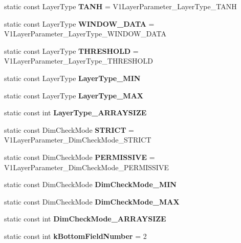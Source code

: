 \begin{DoxyCompactItemize}
\mbox{\label{classcaffe_1_1_v1_layer_parameter_aeb66f78f2e1d0ab91ce7bd97054804fd}} 
static const Layer\+Type {\bfseries T\+A\+NH} = V1\+Layer\+Parameter\+\_\+\+Layer\+Type\+\_\+\+T\+A\+NH
\item 
\mbox{\label{classcaffe_1_1_v1_layer_parameter_a9fcdf6f8449f6aea413b1c9673f23f85}} 
static const Layer\+Type {\bfseries W\+I\+N\+D\+O\+W\+\_\+\+D\+A\+TA} = V1\+Layer\+Parameter\+\_\+\+Layer\+Type\+\_\+\+W\+I\+N\+D\+O\+W\+\_\+\+D\+A\+TA
\item 
\mbox{\label{classcaffe_1_1_v1_layer_parameter_aba58530370567f9f58601f9f447c6b21}} 
static const Layer\+Type {\bfseries T\+H\+R\+E\+S\+H\+O\+LD} = V1\+Layer\+Parameter\+\_\+\+Layer\+Type\+\_\+\+T\+H\+R\+E\+S\+H\+O\+LD
\item 
static const Layer\+Type {\bfseries Layer\+Type\+\_\+\+M\+IN}
\item 
static const Layer\+Type {\bfseries Layer\+Type\+\_\+\+M\+AX}
\item 
static const int {\bfseries Layer\+Type\+\_\+\+A\+R\+R\+A\+Y\+S\+I\+ZE}
\item 
\mbox{\label{classcaffe_1_1_v1_layer_parameter_afaa93b1f8e64825f74cbe16bae4d84ea}} 
static const Dim\+Check\+Mode {\bfseries S\+T\+R\+I\+CT} = V1\+Layer\+Parameter\+\_\+\+Dim\+Check\+Mode\+\_\+\+S\+T\+R\+I\+CT
\item 
\mbox{\label{classcaffe_1_1_v1_layer_parameter_ae8a1f22f26c6b22106ea0592ade3b36d}} 
static const Dim\+Check\+Mode {\bfseries P\+E\+R\+M\+I\+S\+S\+I\+VE} = V1\+Layer\+Parameter\+\_\+\+Dim\+Check\+Mode\+\_\+\+P\+E\+R\+M\+I\+S\+S\+I\+VE
\item 
static const Dim\+Check\+Mode {\bfseries Dim\+Check\+Mode\+\_\+\+M\+IN}
\item 
static const Dim\+Check\+Mode {\bfseries Dim\+Check\+Mode\+\_\+\+M\+AX}
\item 
static const int {\bfseries Dim\+Check\+Mode\+\_\+\+A\+R\+R\+A\+Y\+S\+I\+ZE}
\item 
\mbox{\label{classcaffe_1_1_v1_layer_parameter_a77f29d63c50b4932b93a9e26e0b49283}} 
static const int {\bfseries k\+Bottom\+Field\+Number} = 2

\end{DoxyCompactItemize}
